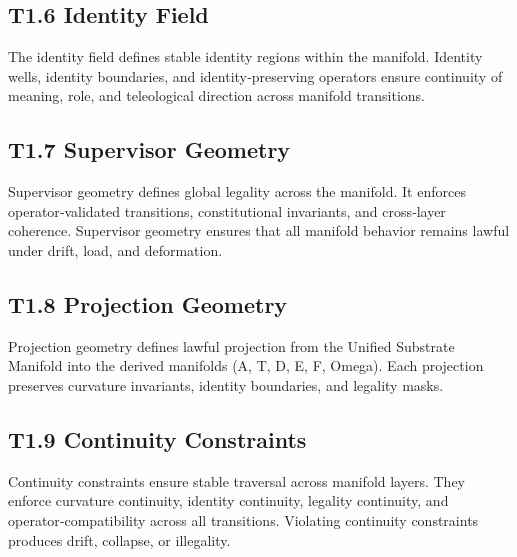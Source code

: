 \subsection{T1.6 Identity Field}
The identity field defines stable identity regions within the manifold. Identity
wells, identity boundaries, and identity‑preserving operators ensure continuity
of meaning, role, and teleological direction across manifold transitions.

\subsection{T1.7 Supervisor Geometry}
Supervisor geometry defines global legality across the manifold. It enforces
operator‑validated transitions, constitutional invariants, and cross‑layer
coherence. Supervisor geometry ensures that all manifold behavior remains
lawful under drift, load, and deformation.

\subsection{T1.8 Projection Geometry}
Projection geometry defines lawful projection from the Unified Substrate
Manifold into the derived manifolds (A, T, D, E, F, Omega). Each projection
preserves curvature invariants, identity boundaries, and legality masks.

\subsection{T1.9 Continuity Constraints}
Continuity constraints ensure stable traversal across manifold layers. They
enforce curvature continuity, identity continuity, legality continuity, and
operator‑compatibility across all transitions. Violating continuity constraints
produces drift, collapse, or illegality.
